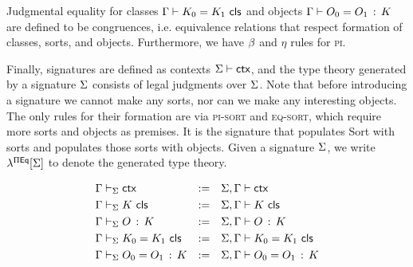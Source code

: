 Judgmental equality for classes $\Gamma \vdash K_{0} = K_{1} \,\, \mathsf{cls}$ and objects
$\Gamma \vdash O_{0} = O_{1} \, : \, K$ are defined to be congruences,
i.e. equivalence relations that respect formation of classes,
sorts, and objects.
Furthermore, we have $\beta$ and $\eta$ rules for \textsc{pi}.

Finally, signatures are defined as contexts $\Sigma \vdash \mathsf{ctx}$,
and the type theory generated by a signature $\Sigma$ consists of
legal judgments over $\Sigma$.
Note that before introducing a signature we cannot make any sorts,
nor can we make any interesting objects.
The only rules for their formation are via \textsc{pi-sort} and \textsc{eq-sort},
which require more sorts and objects as premises.
It is the signature that populates \textsf{Sort} with sorts
and populates those sorts with objects.
Given a signature $\Sigma$, we write $\lambda^{\Pi \mathsf{Eq}}[\Sigma]$ to denote the
generated type theory.

\begin{align*}
  &\Gamma \vdash_\Sigma \mathsf{ctx} & :=
  & & & \Sigma,\Gamma \vdash \mathsf{ctx} \\
  &\Gamma \vdash_\Sigma K \,\, \mathsf{cls} & :=
  & & & \Sigma,\Gamma \vdash K \,\, \mathsf{cls} \\
  &\Gamma \vdash_\Sigma O \, : \, K & :=
  & & & \Sigma,\Gamma \vdash O \, : \, K \\
  &\Gamma \vdash_\Sigma K_{0} = K_{1} \,\, \mathsf{cls} & :=
  & & & \Sigma,\Gamma \vdash K_{0} = K_{1} \,\, \mathsf{cls} \\
  &\Gamma \vdash_\Sigma O_{0} = O_{1} \, : \, K & :=
  & & & \Sigma,\Gamma \vdash O_{0} = O_{1} \, : \, K
\end{align*}
